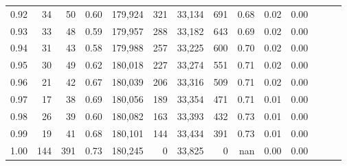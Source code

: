 \begin{tabular}{rrrrrrrrrrrrrr}
0.92 &     34 &   50 &  0.60 &  179,924 &      321 &  33,134 &     691 &  0.68 &  0.02 &      0.00 \\
0.93 &     33 &   48 &  0.59 &  179,957 &      288 &  33,182 &     643 &  0.69 &  0.02 &      0.00 \\
0.94 &     31 &   43 &  0.58 &  179,988 &      257 &  33,225 &     600 &  0.70 &  0.02 &      0.00 \\
0.95 &     30 &   49 &  0.62 &  180,018 &      227 &  33,274 &     551 &  0.71 &  0.02 &      0.00 \\
0.96 &     21 &   42 &  0.67 &  180,039 &      206 &  33,316 &     509 &  0.71 &  0.02 &      0.00 \\
0.97 &     17 &   38 &  0.69 &  180,056 &      189 &  33,354 &     471 &  0.71 &  0.01 &      0.00 \\
0.98 &     26 &   39 &  0.60 &  180,082 &      163 &  33,393 &     432 &  0.73 &  0.01 &      0.00 \\
0.99 &     19 &   41 &  0.68 &  180,101 &      144 &  33,434 &     391 &  0.73 &  0.01 &      0.00 \\
1.00 &    144 &  391 &  0.73 &  180,245 &        0 &  33,825 &       0 &   nan &  0.00 &      0.00 \\
\bottomrule
\end{tabular}
